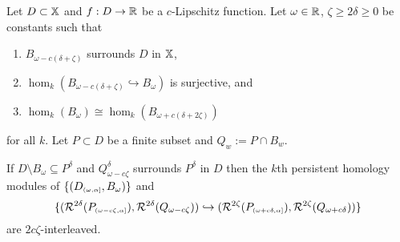 \begin{theorem}
  Let $D\subset\mathbb{X}$ and $f : D\to\mathbb{R}$ be a $c$-Lipschitz function.
  Let $\omega\in\mathbb{R}$, $\zeta\geq 2\delta\geq 0$ be constants such that
  \begin{enumerate}[label=\Roman*.]
    \item $B_{\omega-c(\delta+\zeta)}$ surrounds $D$ in $\mathbb{X}$,
    \item $\hom_k(B_{\omega-c(\delta+\zeta)}\hookrightarrow B_\omega)$ is surjective, and
    \item $\hom_k(B_\omega)\cong\hom_k(B_{\omega+c(\delta+2\zeta)})$
  \end{enumerate}
  for all $k$.
  Let $P\subset D$ be a finite subset and $Q_w := P\cap B_w$.

  If $D\setminus B_\omega\subseteq P^\delta$ and $Q_{\omega-c\zeta}^\delta$ surrounds $P^\delta$ in $D$ then the $k$th persistent homology modules of $\{(D_{\scriptscriptstyle (\omega,\alpha]}, B_\omega)\}$ and
  \[
    \{(\mathcal{R}^{2\delta}(P_{\scriptscriptstyle (\omega-c\zeta,\alpha]}), \mathcal{R}^{2\delta}(Q_{\omega-c\zeta})) \hookrightarrow
      (\mathcal{R}^{2\zeta}(P_{\scriptscriptstyle (\omega+c\delta,\alpha]}), \mathcal{R}^{2\zeta}(Q_{\omega+c\delta}))\}
  \]
  are $2c\zeta$-interleaved.
\end{theorem}
